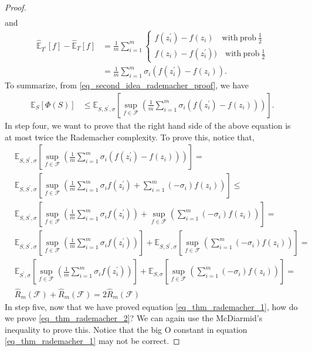 \documentclass[10pt ]{article}
\begin{document}
\begin{proof}
\begin{align}
\end{align}
and 
\begin{align}
 \widehat{\mathbb{E}}_{T^{\prime}}\left[ f\right]  - \widehat{\mathbb{E}}_{T}\left[ f\right]  &= \frac{1}{m} \sum_{i=1}^m 
 \left\{ \begin{array}{ll}
                    f(z_i^{\prime}) - f(z_i) \quad  \mathrm{with~prob~} \frac{1}{2}\\
                    f(z_i) - f(z_i^{\prime}))\quad  \mathrm{with~prob~} \frac{1}{2}
                      \end{array}   
                    \right.    \nonumber \\
               &= \frac{1}{m} \sum_{i=1}^m  \sigma_i \left(  f(z_i^{\prime}) - f(z_i) \right).
\end{align}
To summarize, from \eqref{eq_second_idea_rademacher_proof}, we have 
\begin{align}
 \mathbb{E}_S \left[ \Phi(S) \right] &\le  \mathbb{E}_{S, S^{\prime}, \sigma} \left[  \sup_{f \in \mathcal{F}} \left( \frac{1}{m} \sum_{i=1}^m  \sigma_i \left(  f(z_i^{\prime}) - f(z_i) \right) \right)  \right].
\end{align}
In step four, we want to prove that the right hand side of the above equation is at most twice the Rademacher complexity. To prove this, notice that, 
\begin{align}
 &\mathbb{E}_{S, S^{\prime}, \sigma} \left[  \sup_{f \in \mathcal{F}} \left( \frac{1}{m} \sum_{i=1}^m  \sigma_i \left(  f(z_i^{\prime}) - f(z_i) \right) \right)  \right]  = \nonumber \\
 & \mathbb{E}_{S, S^{\prime}, \sigma} \left[  \sup_{f \in \mathcal{F}} \left( \frac{1}{m} \sum_{i=1}^m  \sigma_i   f(z_i^{\prime}) + \sum_{i=1}^m  (-\sigma_i) f(z_i)  \right)  \right] \le \nonumber \\
 & \mathbb{E}_{S, S^{\prime}, \sigma} \left[  \sup_{f \in \mathcal{F}} \left( \frac{1}{m} \sum_{i=1}^m  \sigma_i   f(z_i^{\prime}) \right) + \sup_{f \in \mathcal{F}} \left( \sum_{i=1}^m  (-\sigma_i) f(z_i)  \right)  \right] = \nonumber \\
 & \mathbb{E}_{S, S^{\prime}, \sigma} \left[  \sup_{f \in \mathcal{F}} \left( \frac{1}{m} \sum_{i=1}^m  \sigma_i   f(z_i^{\prime}) \right) \right] + \mathbb{E}_{S, S^{\prime}, \sigma} \left[ \sup_{f \in \mathcal{F}} \left( \sum_{i=1}^m  (-\sigma_i) f(z_i)  \right)  \right] = \nonumber \\ 
 & \mathbb{E}_{S^{\prime}, \sigma} \left[  \sup_{f \in \mathcal{F}} \left( \frac{1}{m} \sum_{i=1}^m  \sigma_i   f(z_i^{\prime}) \right) \right] + \mathbb{E}_{S,  \sigma} \left[ \sup_{f \in \mathcal{F}} \left( \sum_{i=1}^m  (-\sigma_i) f(z_i)  \right)  \right] = \nonumber \\ 
&\widehat{R}_m({\mathcal{F}}) + \widehat{R}_m({\mathcal{F}}) = 2 \widehat{R}_m({\mathcal{F}})
\end{align}
In step five, now that we have proved equation \eqref{eq_thm_rademacher_1}, how do we prove \eqref{eq_thm_rademacher_2}? We can again use the McDiarmid's inequality to prove this. Notice that the big O constant in equation \eqref{eq_thm_rademacher_1} may not be correct. 
\end{proof}
\end{document}
